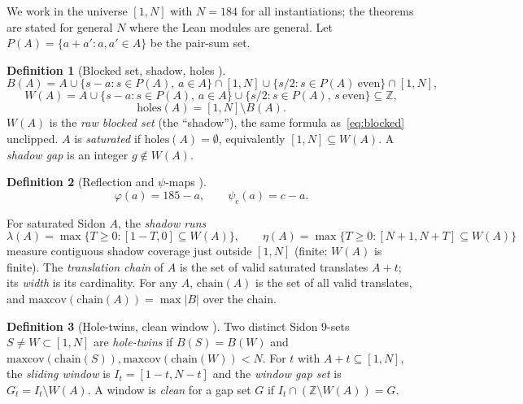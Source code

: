 \documentclass[11pt,a4paper]{article}
\theoremstyle{definition}
\newtheorem{definition}{Definition}
\begin{document}
We work in the universe $[1,N]$ with $N=184$ for all instantiations;
the theorems are stated for general $N$ where the Lean modules are
general. Let $P(A)=\{a+a':a,a'\in A\}$ be the pair-sum set.

\begin{definition}[Blocked set, shadow, holes \cite{D201,D213,D227}]
  \begin{equation}
    \label{eq:blocked}
    B(A)=A\cup\{s-a:s\in P(A),\,a\in A\}\cap[1,N]
          \cup\{s/2:s\in P(A)\ \text{even}\}\cap[1,N],
  \end{equation}
  \begin{equation}
    \label{eq:shadow}
    W(A)=A\cup\{s-a:s\in P(A),\,a\in A\}\cup\{s/2:s\in P(A),\,s\ \text{even}\}
      \subseteq\mathbb{Z},
  \end{equation}
  \begin{equation}
    \label{eq:holes}
    \mathrm{holes}(A)=[1,N]\setminus B(A).
  \end{equation}
  $W(A)$ is the \emph{raw blocked set} (the ``shadow''), the same
  formula as~\eqref{eq:blocked} unclipped. $A$ is \emph{saturated} if
  $\mathrm{holes}(A)=\emptyset$, equivalently $[1,N]\subseteq W(A)$.
  A \emph{shadow gap} is an integer $g\notin W(A)$.
\end{definition}

\begin{definition}[Reflection and $\psi$-maps \cite{D227}]
  \begin{equation}
    \label{eq:phipsi}
    \varphi(a)=185-a,\qquad \psi_c(a)=c-a.
  \end{equation}
\end{definition}

For saturated Sidon $A$, the \emph{shadow runs}
\begin{equation}
  \label{eq:lambdaruns}
  \lambda(A)=\max\{T\ge0:[1-T,0]\subseteq W(A)\},\qquad
  \eta(A)=\max\{T\ge0:[N+1,N+T]\subseteq W(A)\}
\end{equation}
measure contiguous shadow coverage just outside $[1,N]$ (finite:
$W(A)$ is finite). The \emph{translation chain} of $A$ is the set of
valid saturated translates $A+t$; its \emph{width} is its cardinality.
For any $A$, $\mathrm{chain}(A)$ is the set of all valid translates,
and $\mathrm{maxcov}(\mathrm{chain}(A))=\max|B|$ over the chain.

\begin{definition}[Hole-twins, clean window \cite{D231,D240}]
  Two distinct Sidon $9$-sets $S\ne W\subset[1,N]$ are
  \emph{hole-twins} if $B(S)=B(W)$ and
  $\mathrm{maxcov}(\mathrm{chain}(S)),\mathrm{maxcov}(\mathrm{chain}(W))<N$.
  For $t$ with $A+t\subseteq[1,N]$, the \emph{sliding window} is
  $I_t=[1-t,N-t]$ and the \emph{window gap set} is
  $G_t=I_t\setminus W(A)$. A window is \emph{clean} for a gap set $G$
  if $I_t\cap(\mathbb{Z}\setminus W(A))=G$.
\end{definition}
\end{document}
